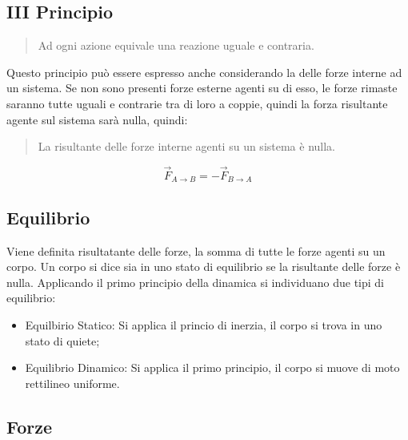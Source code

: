 \documentclass{article}
\numberwithin{equation}{subsection}
\begin{document}
\subsection{III Principio}

\begin{quotation}
    Ad ogni azione equivale una reazione uguale e contraria.
\end{quotation}

Questo principio può essere espresso anche considerando la 
delle forze interne ad un sistema. Se non sono presenti 
forze esterne agenti su di esso, le forze rimaste saranno 
tutte uguali e contrarie tra di loro a coppie, quindi la 
forza risultante agente sul sistema sarà nulla, quindi:

\begin{quotation}
    La risultante delle forze interne agenti su un sistema è nulla.
\end{quotation}

\begin{equation}
    \vec{F}_{A\to B}=-\vec{F}_{B\to A}
\end{equation}

\subsection{Equilibrio}
Viene definita risultatante delle forze, la somma di tutte le 
forze agenti su un corpo. 
Un corpo si dice sia in uno stato di equilibrio se la 
risultante delle forze è nulla. Applicando 
il primo principio della dinamica si individuano due tipi di 
equilibrio:
\begin{itemize}
    \item Equilbirio Statico: Si applica il princio di inerzia, 
    il corpo si trova in uno stato di quiete;
    \item Equilibrio Dinamico: Si applica il primo principio, 
    il corpo si muove di moto rettilineo uniforme.
\end{itemize}
 
\subsection{Forze}
\end{document}
